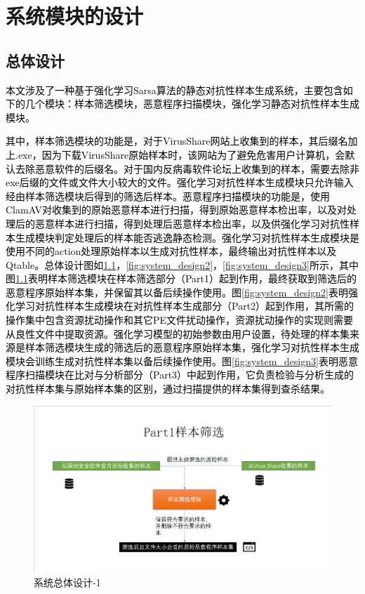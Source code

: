 
\chapter{系统模块的设计}

\section{总体设计}

\textcolor{black}{本文涉及了一种基于强化学习Sarsa算法的静态对抗性样本生成系统，主要包含如下的几个模块：样本筛选模块，恶意程序扫描模块，强化学习静态对抗性样本生成模块。}

\textcolor{black}{其中，样本筛选模块的功能是，对于VirusShare网站上收集到的样本，其后缀名加上.exe，因为下载VirusShare原始样本时，该网站为了避免危害用户计算机，会默认去除恶意软件的后缀名。对于国内反病毒软件论坛上收集到的样本，需要去除非exe后缀的文件或文件大小较大的文件。强化学习对抗性样本生成模块只允许输入经由样本筛选模块后得到的筛选后样本。恶意程序扫描模块的功能是，使用ClamAV对收集到的原始恶意样本进行扫描，得到原始恶意样本检出率，以及对处理后的恶意样本进行扫描，得到处理后恶意样本检出率，以及供强化学习对抗性样本生成模块判定处理后的样本能否逃逸静态检测。强化学习对抗性样本生成模块是使用不同的action处理原始样本以生成对抗性样本，最终输出对抗性样本以及Qtable。总体设计图如\ref{fig:system_design1}，\ref{fig:system_design2}，\ref{fig:system_design3}所示，其中图\ref{fig:system_design1}表明样本筛选模块在样本筛选部分（Part1）起到作用，最终获取到筛选后的恶意程序原始样本集，并保留其以备后续操作使用。图\ref{fig:system_design2}表明强化学习对抗性样本生成模块在对抗性样本生成部分（Part2）起到作用，其所需的操作集中包含资源扰动操作和其它PE文件扰动操作，资源扰动操作的实现则需要从良性文件中提取资源。强化学习模型的初始参数由用户设置，待处理的样本集来源是样本筛选模块生成的筛选后的恶意程序原始样本集，强化学习对抗性样本生成模块会训练生成对抗性样本集以备后续操作使用。图\ref{fig:system_design3}表明恶意程序扫描模块在比对与分析部分（Part3）中起到作用，它负责检验与分析生成的对抗性样本集与原始样本集的区别，通过扫描提供的样本集得到查杀结果。}

\begin{figure}[htbp]
  \centering
  \includegraphics[]{images/system_design1.png}
  \caption{系统总体设计-1}\label{fig:system_design1}
\end{figure}

